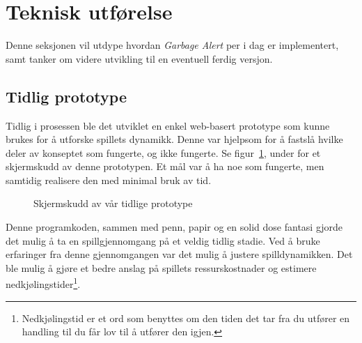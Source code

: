 \section{Teknisk utførelse}\label{sec:teknisk}
Denne seksjonen vil utdype hvordan \emph{Garbage Alert} per i dag er
implementert, samt tanker om videre utvikling til en eventuell ferdig
versjon.
\subsection{Tidlig prototype}
Tidlig i prosessen ble det utviklet en enkel web-basert prototype som
kunne brukes for å utforske spillets dynamikk. Denne var hjelpsom for å
fastslå hvilke deler av konseptet som fungerte, og ikke fungerte. Se
figur~\ref{fig:screenshot_tidlig_prototype}, under for et skjermskudd av
denne prototypen. Et mål var å ha noe som fungerte, men samtidig
realisere den med minimal bruk av tid.
\begin{figure} [H]
	\begin{center}
	\setlength\fboxsep{0.2pt}
	\setlength\fboxrule{0.7pt}
	\end{center}
	\caption{Skjermskudd av vår tidlige prototype}
	\label{fig:screenshot_tidlig_prototype}
\end{figure}

Denne programkoden, sammen med penn, papir og en solid dose fantasi
gjorde det mulig å ta en spillgjennomgang på et veldig tidlig stadie.
Ved å bruke erfaringer fra denne gjennomgangen var det mulig å justere
spilldynamikken. Det ble mulig å gjøre et bedre anslag på spillets
ressurskostnader og estimere
nedkjølingstider\footnote{Nedkjølingstid er et ord som benyttes om den
tiden det tar fra du utfører en handling til du får lov til å utfører
den igjen.}.

